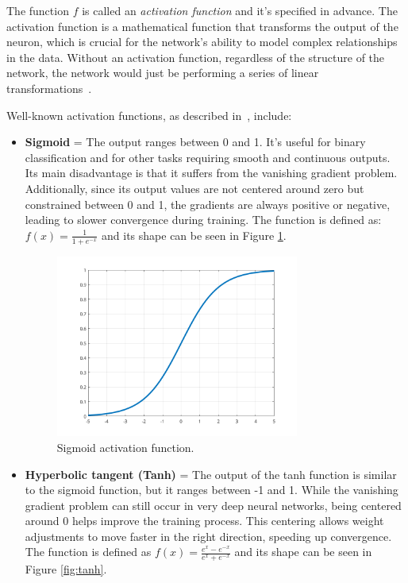 \documentclass[a4paper,oneside,onecolumn,12pt]{book}
\begin{document}
	The function $f$ is called an \textit{activation function} and it's specified in advance. The activation function is a mathematical function that transforms the output of the neuron, which is crucial for the network's ability to model complex relationships in the data. Without an activation function, regardless of the structure of the network, the network would just be performing a series of linear transformations~\cite{DLP}.
	
	Well-known activation functions, as described in~\cite{AFNNHCRO}, include:
	\begin{itemize}
		\item \textbf{Sigmoid} = The output ranges between 0 and 1. It's useful for binary classification and for other tasks requiring smooth and continuous outputs. Its main disadvantage is that it suffers from the vanishing gradient problem. Additionally, since its output values are not centered around zero but constrained between 0 and 1, the gradients are always positive or negative, leading to slower convergence during training. The function is defined as: $f(x) = \frac{1}{1 + e^{-x}}$ and its shape can be seen in Figure \ref{fig:sigmoid}.
		\begin{figure}[H]
		\begin{center}
			\includegraphics[keepaspectratio,width=8cm]{kep/sigmoid.png}
			\caption{Sigmoid activation function.}
			\label{fig:sigmoid}
		\end{center}
		\end{figure}
		\item \textbf{Hyperbolic tangent (Tanh)} = The output of the tanh function is similar to the sigmoid function, but it ranges between -1 and 1. While the vanishing gradient problem can still occur in very deep neural networks, being centered around 0 helps improve the training process. This centering allows weight adjustments to move faster in the right direction, speeding up convergence. The function is defined as $f(x) = \frac{e^x - e^{-x}}{e^x + e^{-x}}$ and its shape can be seen in Figure \ref{fig:tanh}.

\end{itemize}
\end{document}
